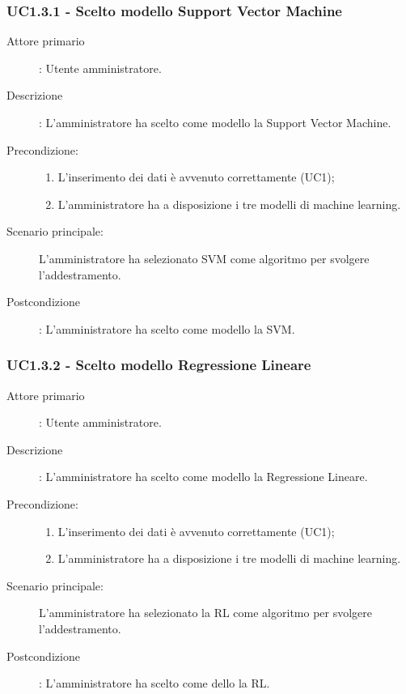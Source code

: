 \subsubsection{UC1.3.1 - Scelto modello Support Vector Machine}
\label{sssec:uc1.3.1}
\begin{description}
  \item[Attore primario]: Utente amministratore.
  \item[Descrizione]: L'amministratore ha scelto come modello la Support Vector Machine.
  \item[Precondizione:]
  \begin{enumerate}
    \item L'inserimento dei dati è avvenuto correttamente (UC1);
    \item L'amministratore ha a disposizione i tre modelli di machine learning.
  \end{enumerate}
  \item[Scenario principale:] L'amministratore ha selezionato SVM come algoritmo per svolgere l'addestramento.
  \item[Postcondizione]: L'amministratore ha scelto come modello la SVM.
\end{description}

\subsubsection{UC1.3.2 - Scelto modello Regressione Lineare}
\label{sssec:uc1.3.2}
\begin{description}
  \item[Attore primario]: Utente amministratore.
  \item[Descrizione]: L'amministratore ha scelto come modello la Regressione Lineare.
  \item[Precondizione:]
  \begin{enumerate}
    \item L'inserimento dei dati è avvenuto correttamente (UC1);
    \item L'amministratore ha a disposizione i tre modelli di machine learning.
  \end{enumerate}
  \item[Scenario principale:] L'amministratore ha selezionato la RL come algoritmo per svolgere l'addestramento.
  \item[Postcondizione]: L'amministratore ha scelto come dello la RL.
\end{description}

